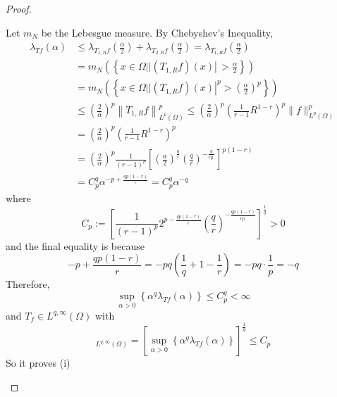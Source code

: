 \begin{proof}
\begin{enumerate}[label=(\Roman*)]
		\noindent Let $m_N$ be the Lebesgue measure. By Chebyshev’s Inequality,
		\begin{equation*}
			\begin{aligned}
				\lambda_{T f}(\alpha) & \leq \lambda_{T_{1, R} f}\left(\frac{\alpha}{2}\right)+\lambda_{T_{2, R} f}\left(\frac{\alpha}{2}\right)=\lambda_{T_{1, R} f}\left(\frac{\alpha}{2}\right) \\
				& =m_N\left(\left\{x \in \Omega| |\left(T_{1, R} f\right)(x) \left\lvert\,>\frac{\alpha}{2}\right.\right\}\right) \\
				& =m_N\left(\left\{\left.x \in \Omega| |\left(T_{1, R} f\right)(x)\right|^p>\left(\frac{\alpha}{2}\right)^p\right\}\right) \\
				& \leq\left(\frac{2}{\alpha}\right)^p\left\|T_{1, R} f\right\|_{L^p(\Omega)}^p \leq\left(\frac{2}{\alpha}\right)^p\left(\frac{1}{r-1} R^{1-r}\right)^p\|f\|_{L^p(\Omega)}^p \\
				& =\left(\frac{2}{\alpha}\right)^p\left(\frac{1}{r-1} R^{1-r}\right)^p \\
				& =\left(\frac{2}{\alpha}\right)^p \frac{1}{(r-1)^p}\left[\left(\frac{\alpha}{2}\right)^{\frac{q}{r}}\left(\frac{q}{r}\right)^{-\frac{q}{r p^{\prime}}}\right]^{p(1-r)} \\
				& =C_p^q \alpha^{-p+\frac{q p(1-r)}{r}}=C_p^q \alpha^{-q}
			\end{aligned}
		\end{equation*}
		where
		\begin{equation*}
			C_p:=\left[\frac{1}{(r-1)^p} 2^{p-\frac{q p(1-r)}{r}}\left(\frac{q}{r}\right)^{-\frac{q p(1-r)}{r p^{\prime}}}\right]^{\frac{1}{q}} > 0
		\end{equation*}
		and the final equality is because
		\begin{equation*}
			-p+\frac{q p(1-r)}{r}=-p q\left(\frac{1}{q}+1-\frac{1}{r}\right)=-p q \cdot \frac{1}{p}=-q
		\end{equation*}
		Therefore,
		\begin{equation*}
			\sup _{\alpha>0}\left\{\alpha^q \lambda_{T f}(\alpha)\right\} \leq C_p^q<\infty
		\end{equation*}
		and $T_f \in L^{q,\infty}(\Omega)$ with
		\begin{equation*}
			[T f]_{L^{q, \infty}(\Omega)}=\left[\sup _{\alpha>0}\left\{\alpha^q \lambda_{T f}(\alpha)\right\}\right]^{\frac{1}{q}} \leq C_p
		\end{equation*}
		So it proves (i)


\end{enumerate}
\end{proof}
